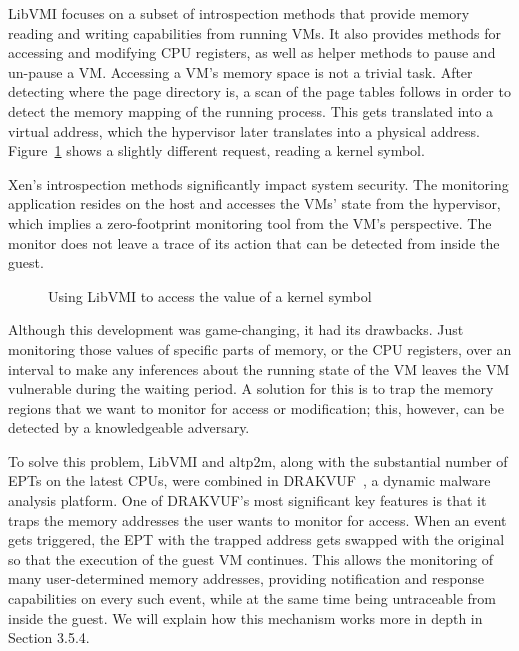 \par LibVMI focuses on a subset of introspection methods that provide memory reading and writing capabilities from running \ac{VM}s. It also provides methods for accessing and modifying \ac{CPU} registers, as well as helper methods to pause and un-pause a \ac{VM}. Accessing a \ac{VM}'s memory space is not a trivial task. After detecting where the page directory is, a scan of the page tables follows in order to detect the memory mapping of the running process. This gets translated into a virtual address, which the hypervisor later translates into a physical address. Figure~\ref{fig:accesskernel} shows a slightly different request, reading a kernel symbol.

\par Xen’s introspection methods significantly impact system security. The monitoring application resides on the host and accesses the \ac{VM}s' state from the hypervisor, which implies a zero-footprint monitoring tool from the \ac{VM}'s perspective. The monitor does not leave a trace of its action that can be detected from inside the guest.

\begin{figure}[ht]
	\centering
	
	\caption{Using LibVMI to access the value of a kernel symbol}
	\label{fig:accesskernel}
\end{figure}

\par Although this development was game-changing, it had its drawbacks. Just monitoring those values of specific parts of memory, or the \ac{CPU} registers, over an interval to make any inferences about the running state of the \ac{VM} leaves the \ac{VM} vulnerable during the waiting period. A solution for this is to trap the memory regions that we want to monitor for access or modification; this, however, can be detected by a knowledgeable adversary. 

\par To solve this problem, LibVMI and altp2m, along with the substantial number of \ac{EPT}s on the latest \ac{CPU}s, were combined in DRAKVUF~\cite{lengyel2014drakvuf}, a dynamic malware analysis platform. One of DRAKVUF's most significant key features is that it traps the memory addresses the user wants to monitor for access. When an event gets triggered, the \ac{EPT} with the trapped address gets swapped with the original so that the execution of the guest \ac{VM} continues. This allows the monitoring of many user-determined memory addresses, providing notification and response capabilities on every such event, while at the same time being untraceable from inside the guest. We will explain how this mechanism works more in depth in Section 3.5.4.


